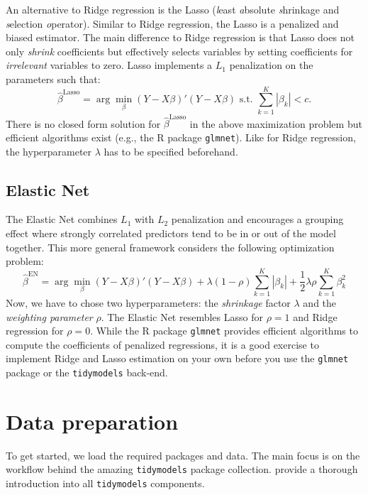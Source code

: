 \documentclass[
]{book}
\begin{document}
An alternative to Ridge regression is the Lasso (\emph{l}east \emph{a}bsolute \emph{s}hrinkage and \emph{s}election \emph{o}perator). Similar to Ridge regression, the Lasso \citep{Tibshirani1996} is a penalized and biased estimator.
The main difference to Ridge regression is that Lasso does not only \emph{shrink} coefficients but effectively selects variables by setting coefficients for \emph{irrelevant} variables to zero. Lasso implements a \(L_1\) penalization on the parameters such that: \[\hat\beta^\text{Lasso} = \arg\min_\beta \left(Y - X\beta\right)'\left(Y - X\beta\right)\text{ s.t. } \sum\limits_{k=1}^K|\beta_k| < c.\] There is no closed form solution for \(\hat\beta^\text{Lasso}\) in the above maximization problem but efficient algorithms exist (e.g., the R package \texttt{glmnet}). Like for Ridge regression, the hyperparameter \(\lambda\) has to be specified beforehand.

\hypertarget{elastic-net}{%
\subsection{Elastic Net}\label{elastic-net}}

The Elastic Net \citep{Zou2005} combines \(L_1\) with \(L_2\) penalization and encourages a grouping effect where strongly correlated predictors tend to be in or out of the model together. This more general framework considers the following optimization problem: \[\hat\beta^\text{EN} = \arg\min_\beta \left(Y - X\beta\right)'\left(Y - X\beta\right) + \lambda(1-\rho)\sum\limits_{k=1}^K|\beta_k| +\frac{1}{2}\lambda\rho\sum\limits_{k=1}^K\beta_k^2\] Now, we have to chose two hyperparameters: the \emph{shrinkage} factor \(\lambda\) and the \emph{weighting parameter} \(\rho\). The Elastic Net resembles Lasso for \(\rho = 1\) and Ridge regression for \(\rho = 0\). While the R package \texttt{glmnet} provides efficient algorithms to compute the coefficients of penalized regressions, it is a good exercise to implement Ridge and Lasso estimation on your own before you use the \texttt{glmnet} package or the \texttt{tidymodels} back-end.

\hypertarget{data-preparation-5}{%
\section{Data preparation}\label{data-preparation-5}}

To get started, we load the required packages and data. The main focus is on the workflow behind the amazing \texttt{tidymodels} package collection. \citet{Kuhn2022} provide a thorough introduction into all \texttt{tidymodels} components.
\end{document}
